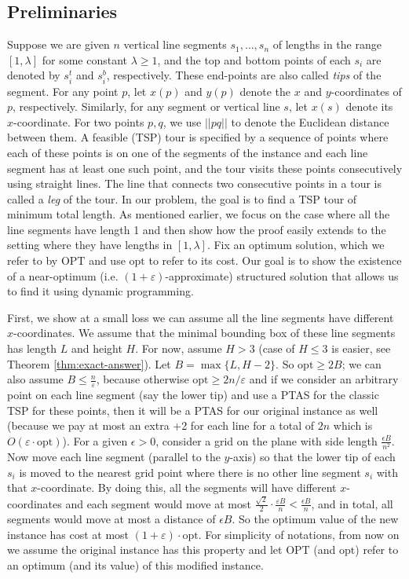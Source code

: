 \documentclass[10pt,a4paper]{amsart}
\theoremstyle{thmstyleone}
\newcommand{\eps}{\varepsilon}
\newcommand{\opt}{{\text{opt}}}
\newcommand{\OPT}{{\text{OPT}}}
\begin{document}
\subsection{Preliminaries}\label{sec:prem}
Suppose we are given $n$ vertical line segments $s_1,\ldots,s_n$ of lengths in the range $[1,\lambda]$ for some constant $\lambda \ge 1$, and the top and bottom points of each $s_i$ are denoted by $s^t_i$ and $s^b_i$, respectively. These end-points are also called {\em tips} of the segment. For any point $p$, let $ x(p) $ and $ y(p) $ denote the $x$ and $y$-coordinates of $p$, respectively. Similarly, for any segment or vertical line $s$, let $ x(s) $ denote its $x$-coordinate.
For two points $p,q$, we use $||pq||$ to denote the Euclidean distance between them.
A feasible (TSP) tour is specified by a sequence of points where each of these points is on one of the segments of the instance and each line segment has at least one such point, and the tour visits these points consecutively using straight lines. The line that connects two consecutive points in a tour is called a {\em leg} of the tour.
In our problem, the goal is to find a TSP tour of minimum total length. As mentioned earlier, we focus on the case where all the line segments have length 1 and then show how the proof easily extends to the setting where they have lengths in $[1,\lambda]$.
Fix an optimum solution, which we refer to by $\OPT$ and use
$\opt$ to refer to its cost. Our goal is to show the existence of a near-optimum (i.e. $(1+\eps)$-approximate) structured solution that allows us to find it using dynamic programming.


First, we show at a small loss we can assume all the line segments have different $x$-coordinates.
We assume that the minimal bounding box of these line segments has length $L$ and height $H$. For now, assume $ H > 3 $ (case of $H\leq 3$ is easier, see Theorem \ref{thm:exact-answer}). Let $ B = \max \{L, H-2\} $. So $\opt\geq 2B$; we can also assume $B\leq \frac{n}{\eps}$, because otherwise $\opt\geq 2n/\eps$ and if we consider an arbitrary point on each line segment (say the lower tip) and use a PTAS for the classic TSP for these points, then it will be a PTAS for our original instance as well (because we pay at most an extra +2 for each line for a total of $2n$ which is $O(\eps\cdot\opt)$).
For a given $ \epsilon > 0 $, consider a grid on the plane with side length $ \frac{\epsilon B}{n^2}$. Now move each line segment (parallel to the $y$-axis) so that the lower tip of each $s_i $ is moved to the nearest grid point where there is no other line segment $s_i$ with that $x$-coordinate. By doing this, all the segments will have different $x$-coordinates and each segment would move at most $\frac{\sqrt 2}2\cdot\frac{\eps B}n < \frac{\epsilon B}n $, and in total, all segments would move at most a distance of $\epsilon B$. So the optimum value of the new instance has cost at most $(1+\eps)\cdot\opt$.
For simplicity of notations, from now on we assume the original instance has this property and let $\OPT$ (and $\opt$) refer to an optimum (and its value) of this modified instance.
\end{document}
